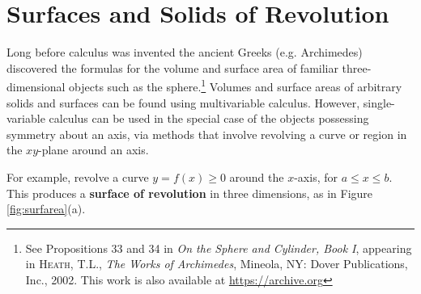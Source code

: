 \section{Surfaces and Solids of Revolution}\label{sec:surfaces-and-solids-of-revolution}
Long before calculus was invented the ancient Greeks (e.g. Archimedes)
discovered the formulas for the volume and surface area of familiar
three-dimensional objects such as the sphere.\footnote{See Propositions 33 and
34 in \emph{On the Sphere and Cylinder, Book I}, appearing in
\textsc{Heath, T.L.}, \emph{The Works of Archimedes}, Mineola, NY: Dover
Publications, Inc., 2002. This work is also available at
\url{https://archive.org}} Volumes and surface
areas of arbitrary solids and surfaces can be found using multivariable
calculus. However, single-variable calculus can be used in the special case of
the objects possessing symmetry about an axis, via methods that involve
revolving a curve or region in the $xy$-plane around an
axis.

For example, revolve a curve $y=f(x) \ge 0$ around the $x$-axis, for
$a \le x \le b$. This produces a \textbf{surface of revolution} in three
dimensions, as in Figure \ref{fig:surfarea}(a).


